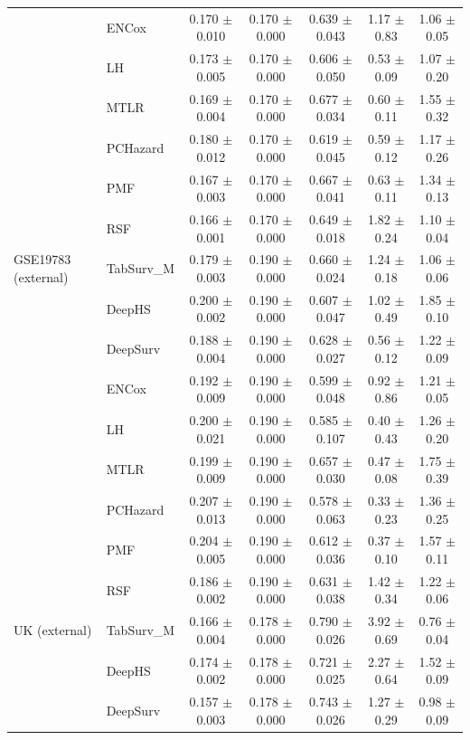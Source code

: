 \begin{longtable}{llccccc}
 & ENCox & 0.170 $\pm$ 0.010 & 0.170 $\pm$ 0.000 & 0.639 $\pm$ 0.043 & 1.17 $\pm$ 0.83 & 1.06 $\pm$ 0.05 \\
 & LH & 0.173 $\pm$ 0.005 & 0.170 $\pm$ 0.000 & 0.606 $\pm$ 0.050 & 0.53 $\pm$ 0.09 & 1.07 $\pm$ 0.20 \\
 & MTLR & 0.169 $\pm$ 0.004 & 0.170 $\pm$ 0.000 & 0.677 $\pm$ 0.034 & 0.60 $\pm$ 0.11 & 1.55 $\pm$ 0.32 \\
 & PCHazard & 0.180 $\pm$ 0.012 & 0.170 $\pm$ 0.000 & 0.619 $\pm$ 0.045 & 0.59 $\pm$ 0.12 & 1.17 $\pm$ 0.26 \\
 & PMF & 0.167 $\pm$ 0.003 & 0.170 $\pm$ 0.000 & 0.667 $\pm$ 0.041 & 0.63 $\pm$ 0.11 & 1.34 $\pm$ 0.13 \\
 & RSF & 0.166 $\pm$ 0.001 & 0.170 $\pm$ 0.000 & 0.649 $\pm$ 0.018 & 1.82 $\pm$ 0.24 & 1.10 $\pm$ 0.04 \\
\midrule
GSE19783 (external) & TabSurv\_M & 0.179 $\pm$ 0.003 & 0.190 $\pm$ 0.000 & 0.660 $\pm$ 0.024 & 1.24 $\pm$ 0.18 & 1.06 $\pm$ 0.06 \\
 & DeepHS & 0.200 $\pm$ 0.002 & 0.190 $\pm$ 0.000 & 0.607 $\pm$ 0.047 & 1.02 $\pm$ 0.49 & 1.85 $\pm$ 0.10 \\
 & DeepSurv & 0.188 $\pm$ 0.004 & 0.190 $\pm$ 0.000 & 0.628 $\pm$ 0.027 & 0.56 $\pm$ 0.12 & 1.22 $\pm$ 0.09 \\
 & ENCox & 0.192 $\pm$ 0.009 & 0.190 $\pm$ 0.000 & 0.599 $\pm$ 0.048 & 0.92 $\pm$ 0.86 & 1.21 $\pm$ 0.05 \\
 & LH & 0.200 $\pm$ 0.021 & 0.190 $\pm$ 0.000 & 0.585 $\pm$ 0.107 & 0.40 $\pm$ 0.43 & 1.26 $\pm$ 0.20 \\
 & MTLR & 0.199 $\pm$ 0.009 & 0.190 $\pm$ 0.000 & 0.657 $\pm$ 0.030 & 0.47 $\pm$ 0.08 & 1.75 $\pm$ 0.39 \\
 & PCHazard & 0.207 $\pm$ 0.013 & 0.190 $\pm$ 0.000 & 0.578 $\pm$ 0.063 & 0.33 $\pm$ 0.23 & 1.36 $\pm$ 0.25 \\
 & PMF & 0.204 $\pm$ 0.005 & 0.190 $\pm$ 0.000 & 0.612 $\pm$ 0.036 & 0.37 $\pm$ 0.10 & 1.57 $\pm$ 0.11 \\
 & RSF & 0.186 $\pm$ 0.002 & 0.190 $\pm$ 0.000 & 0.631 $\pm$ 0.038 & 1.42 $\pm$ 0.34 & 1.22 $\pm$ 0.06 \\
\midrule
UK (external) & TabSurv\_M & 0.166 $\pm$ 0.004 & 0.178 $\pm$ 0.000 & 0.790 $\pm$ 0.026 & 3.92 $\pm$ 0.69 & 0.76 $\pm$ 0.04 \\
 & DeepHS & 0.174 $\pm$ 0.002 & 0.178 $\pm$ 0.000 & 0.721 $\pm$ 0.025 & 2.27 $\pm$ 0.64 & 1.52 $\pm$ 0.09 \\
 & DeepSurv & 0.157 $\pm$ 0.003 & 0.178 $\pm$ 0.000 & 0.743 $\pm$ 0.026 & 1.27 $\pm$ 0.29 & 0.98 $\pm$ 0.09 \\

\end{longtable}
